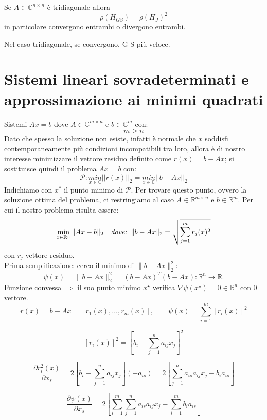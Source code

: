 \documentclass[12pt,a4paper,]{report}
\newcommand{\s}{\hspace{1mm}}
\begin{document}
\begin{teorema}
    Se $A\in \mathbb{C}^{n\times n}$ è tridiagonale allora 
    \[
    \rho(H_{GS}) = \rho(H_J)^2
    \]
    in particolare convergono entrambi o divergono entrambi.
\end{teorema}
\begin{nota}
    Nel caso tridiagonale, se convergono, G-S più veloce.
\end{nota}

\section{Sistemi lineari sovradeterminati e approssimazione ai minimi quadrati}
Sistemi $Ax=b$ dove $A\in\mathbb{C}^{m\times n}$ e $b\in\mathbb{C}^m$ con:
\[
m>n
\]
Dato che spesso la soluzione non esiste, infatti è normale che $x$ soddisfi contemporaneamente più condizioni incompatibili tra loro, allora è di nostro interesse minimizzare il vettore residuo definito come $r(x) = b - Ax$; si sostituisce quindi il problema $Ax=b$ con:
\begin{equation}
\label{eq: min quad}
\mathcal{P}: \underset{x\in \mathbb{C}}{min}||r(x)||_2 = \underset{x\in \mathbb{C}}{min}||b-Ax||_2
\end{equation}
Indichiamo con $x^*$ il punto minimo di $\mathcal{P}$.
Per trovare questo punto, ovvero la soluzione ottima del problema, ci restringiamo al caso $A \in \mathbb{R}^{m \times n}$ e $b \in \mathbb{R}^m$.
Per cui il nostro problema risulta essere:
\[
\min_{x \in \mathbb{R}^n} \|Ax - b\|_2
\quad
\textit{dove:}
\s\s
\|b - Ax\|_2 = \sqrt{\sum_{j=1}^{m} r_j(x)^2}
\]
con $r_j$ vettore residuo.\\
Prima semplificazione: cerco il minimo di $\|b - Ax\|_2^2$:
\[
\psi(x) = \|b - Ax\|_2^2 = (b - Ax)^T (b - Ax) :
\mathbb{R}^n \to \mathbb{R}.
\]
Funzione convessa $\Rightarrow$ il suo punto minimo $x^\star$ verifica $\nabla \psi(x^\star) = 0 \in \mathbb{R}^n$ con $0$ vettore.
\[
\boxed{r(x) = b - Ax} = [r_1(x), \ldots, r_m(x)],
\qquad
\psi(x) = \sum_{i=1}^{m} [r_i(x)]^2
\]

\[
[r_i(x)]^2 =
\left[
b_i - \sum_{j=1}^{n} a_{ij} x_j
\right]^2
\]

\[
\frac{\partial r_i^2(x)}{\partial x_s}
= 2 \left[
b_i - \sum_{j=1}^{n} a_{ij} x_j
\right] (-a_{is})
= 2 \left[
\sum_{j=1}^{n} a_{is} a_{ij} x_j - b_i a_{is}
\right]
\]

\[
\frac{\partial \psi(x)}{\partial x_s}
= 2 \left[
\sum_{i=1}^{m} \sum_{j=1}^{n} a_{is} a_{ij} x_j
- \sum_{i=1}^{m} b_i a_{is}
\right]
\]
\end{document}
